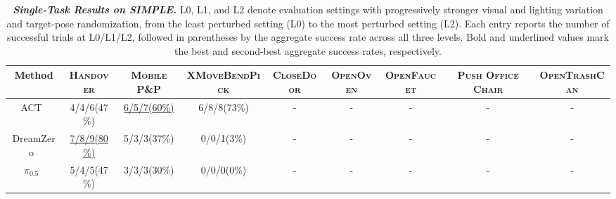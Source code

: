\begin{table}[H]
  \caption{
    \textbf{\textit{Single-Task Results on SIMPLE.}} L0, L1, and L2 denote evaluation settings with progressively stronger visual and lighting variation and target-pose randomization, from the least perturbed setting (L0) to the most perturbed setting (L2). Each entry reports the number of successful trials at L0/L1/L2, followed in parentheses by the aggregate success rate across all three levels. Bold and underlined values mark the best and second-best aggregate success rates, respectively.
  }
  \label{table:simple_main_results}
  \centering
  \setlength{\tabcolsep}{0pt}
  \renewcommand{\arraystretch}{1.08}
  \fontsize{6.2}{7}\selectfont
  \newcommand{\taskheader}[1]{{\fontsize{5.55}{6.2}\selectfont\textbf{\textsc{\hspace{2.2pt}#1\hspace{2.2pt}}}}}
  \newcommand{\resultentry}[2]{{\fontsize{5.2}{6}\selectfont\hspace{2.2pt}#1\;(#2)\hspace{2.2pt}}}
  \newcommand{\bestentry}[2]{{\fontsize{5.2}{6}\selectfont\textbf{\hspace{2.2pt}#1\;(#2)\hspace{2.2pt}}}}
  \newcommand{\secondentry}[2]{{\fontsize{5.2}{6}\selectfont\hspace{2.2pt}\underline{#1\;(#2)}\hspace{2.2pt}}}

  \begin{adjustbox}{width=\textwidth}
  \begin{tabular}{@{}c*{8}{c}@{}}
    \toprule
    {\fontsize{5.55}{6.2}\selectfont\textbf{Method}}
    & \taskheader{Handover}
    & \taskheader{Mobile P\&P}
    & \taskheader{XMoveBendPick}
    & \taskheader{CloseDoor}
    & \taskheader{OpenOven}
    & \taskheader{OpenFaucet}
    & \taskheader{Push Office Chair}
    & \taskheader{OpenTrashCan} \\
    \midrule

    ACT~\cite{ACT}
    & \resultentry{4/4/6}{47\%}
    & \secondentry{6/5/7}{60\%}
    & \resultentry{6/8/8}{73\%}
    & - & - & - & - & - \\

    DreamZero~\cite{dreamzero}
    & \secondentry{7/8/9}{80\%}
    & \resultentry{5/3/3}{37\%}
    & \resultentry{0/0/1}{3\%}
    & - & - & - & - & - \\

    $\pi_{0.5}$~\cite{pi05}
    & \resultentry{5/4/5}{47\%}
    & \resultentry{3/3/3}{30\%}
    & \resultentry{0/0/0}{0\%}
    & - & - & - & - & - \\


\end{tabular}
\end{adjustbox}
\end{table}
